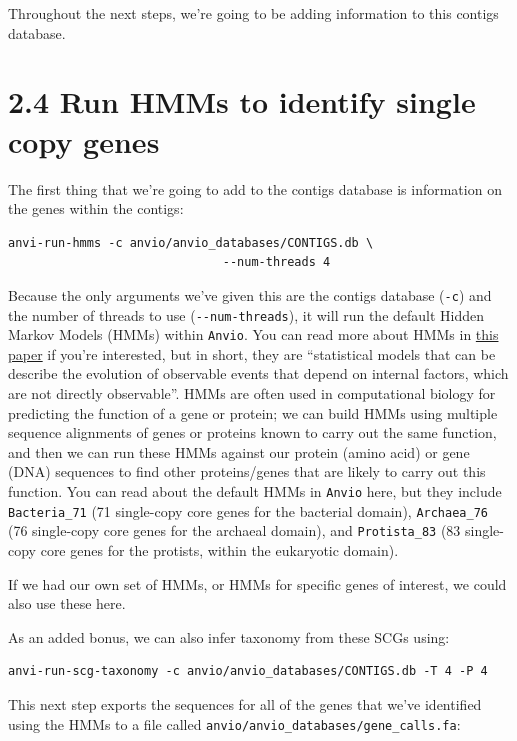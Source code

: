 \documentclass[
]{book}
\begin{document}
Throughout the next steps, we're going to be adding information to this contigs database.

\section{2.4 Run HMMs to identify single copy genes}\label{run-hmms-to-identify-single-copy-genes}

The first thing that we're going to add to the contigs database is information on the genes within the contigs:

\begin{verbatim}
anvi-run-hmms -c anvio/anvio_databases/CONTIGS.db \
                              --num-threads 4
\end{verbatim}

Because the only arguments we've given this are the contigs database (\texttt{-c}) and the number of threads to use (\texttt{-\/-num-threads}), it will run the default Hidden Markov Models (HMMs) within \texttt{Anvi\textquotesingle{}o}. You can read more about HMMs in \href{http://eddylab.org/software/hmmer/Userguide.pdf}{this paper} if you're interested, but in short, they are ``statistical models that can be describe the evolution of observable events that depend on internal factors, which are not directly observable''. HMMs are often used in computational biology for predicting the function of a gene or protein; we can build HMMs using multiple sequence alignments of genes or proteins known to carry out the same function, and then we can run these HMMs against our protein (amino acid) or gene (DNA) sequences to find other proteins/genes that are likely to carry out this function. You can read about the default HMMs in \texttt{Anvi\textquotesingle{}o} here, but they include \texttt{Bacteria\_71} (71 single-copy core genes for the bacterial domain), \texttt{Archaea\_76} (76 single-copy core genes for the archaeal domain), and \texttt{Protista\_83} (83 single-copy core genes for the protists, within the eukaryotic domain).

If we had our own set of HMMs, or HMMs for specific genes of interest, we could also use these here.

As an added bonus, we can also infer taxonomy from these SCGs using:

\begin{verbatim}
anvi-run-scg-taxonomy -c anvio/anvio_databases/CONTIGS.db -T 4 -P 4
\end{verbatim}

This next step exports the sequences for all of the genes that we've identified using the HMMs to a file called \texttt{anvio/anvio\_databases/gene\_calls.fa}:
\end{document}
